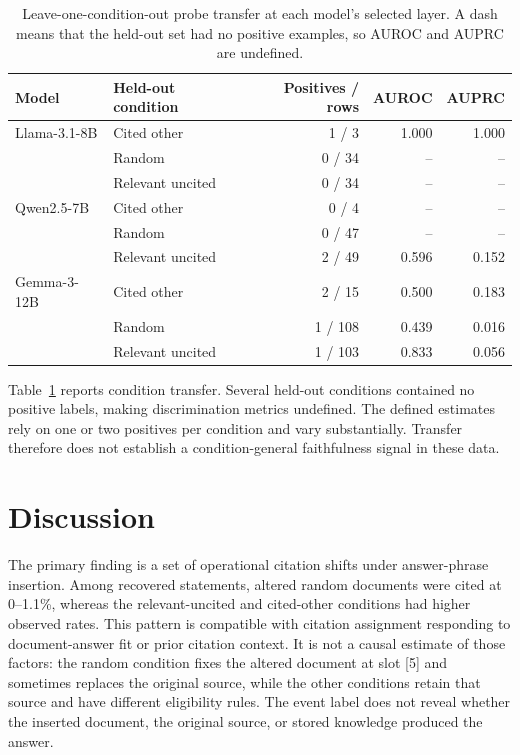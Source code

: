\documentclass[a4paper,fleqn]{cas-sc}
\begin{document}
\begin{table}[t]
\centering
\small
\begin{tabular}{llrrr}
\toprule
Model & Held-out condition & Positives / rows & AUROC & AUPRC \\
\midrule
Llama-3.1-8B & Cited other & 1 / 3 & 1.000 & 1.000 \\
 & Random & 0 / 34 & -- & -- \\
 & Relevant uncited & 0 / 34 & -- & -- \\
Qwen2.5-7B & Cited other & 0 / 4 & -- & -- \\
 & Random & 0 / 47 & -- & -- \\
 & Relevant uncited & 2 / 49 & 0.596 & 0.152 \\
Gemma-3-12B & Cited other & 2 / 15 & 0.500 & 0.183 \\
 & Random & 1 / 108 & 0.439 & 0.016 \\
 & Relevant uncited & 1 / 103 & 0.833 & 0.056 \\
\bottomrule
\end{tabular}
\caption{Leave-one-condition-out probe transfer at each model's selected layer. A dash means that the held-out set had no positive examples, so AUROC and AUPRC are undefined.}
\label{tab:probe-transfer}
\end{table}

Table~\ref{tab:probe-transfer} reports condition transfer. Several held-out conditions contained no positive labels, making discrimination metrics undefined. The defined estimates rely on one or two positives per condition and vary substantially. Transfer therefore does not establish a condition-general faithfulness signal in these data.

\section{Discussion}
\label{sec:discussion}

The primary finding is a set of operational citation shifts under answer-phrase insertion. Among recovered statements, altered random documents were cited at 0--1.1\%, whereas the relevant-uncited and cited-other conditions had higher observed rates. This pattern is compatible with citation assignment responding to document-answer fit or prior citation context. It is not a causal estimate of those factors: the random condition fixes the altered document at slot [5] and sometimes replaces the original source, while the other conditions retain that source and have different eligibility rules. The event label does not reveal whether the inserted document, the original source, or stored knowledge produced the answer.
\end{document}
